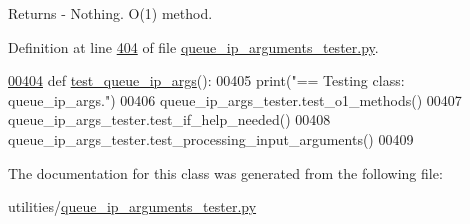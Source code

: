 \begin{DoxyReturn}{Returns}
-\/ Nothing. O(1) method. 
\end{DoxyReturn}


Definition at line \hyperlink{queue__ip__arguments__tester_8py_source_l00404}{404} of file \hyperlink{queue__ip__arguments__tester_8py_source}{queue\+\_\+ip\+\_\+arguments\+\_\+tester.\+py}.


\begin{DoxyCode}
\hypertarget{classutilities_1_1queue__ip__arguments__tester_1_1queue__ip__args__tester_l00404}{}\hyperlink{classutilities_1_1queue__ip__arguments__tester_1_1queue__ip__args__tester_aee90077323d94238d7f81b23e31207c3}{00404}     \textcolor{keyword}{def }\hyperlink{classutilities_1_1queue__ip__arguments__tester_1_1queue__ip__args__tester_aee90077323d94238d7f81b23e31207c3}{test\_queue\_ip\_args}():
00405         print(\textcolor{stringliteral}{"==   Testing class: queue\_ip\_args."})
00406         queue\_ip\_args\_tester.test\_o1\_methods()
00407         queue\_ip\_args\_tester.test\_if\_help\_needed()
00408         queue\_ip\_args\_tester.test\_processing\_input\_arguments()
00409 \end{DoxyCode}


The documentation for this class was generated from the following file\+:\begin{DoxyCompactItemize}
\item 
utilities/\hyperlink{queue__ip__arguments__tester_8py}{queue\+\_\+ip\+\_\+arguments\+\_\+tester.\+py}\end{DoxyCompactItemize}
